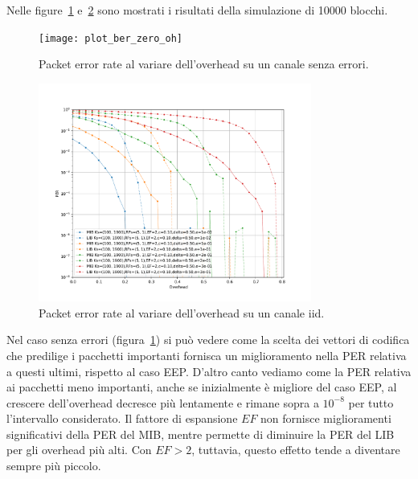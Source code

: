 \documentclass[italian, a4paper, 12pt]{article}
\begin{document}
Nelle figure~\ref{fig:zero_oh} e~\ref{fig:iid_oh} sono mostrati i
risultati della simulazione di 10000 blocchi.
%
\begin{figure}[htb]
  \centering
  \texttt{[image: plot\_ber\_zero\_oh]}
  \caption{Packet error rate al variare dell'overhead su un canale
    senza errori.}
  \label{fig:zero_oh}
\end{figure}
%
\begin{figure}[htb]
  \centering
  \includegraphics[width=0.8\textwidth]{plot_ber_iid}
  \caption{Packet error rate al variare dell'overhead su un canale
    iid.}
  \label{fig:iid_oh}
\end{figure}

%
%

Nel caso senza errori (figura~\ref{fig:zero_oh}) si può vedere come la
scelta dei vettori di codifica che predilige i pacchetti importanti
fornisca un miglioramento nella PER relativa a questi ultimi, rispetto
al caso EEP.
%
D'altro canto vediamo come la PER relativa ai pacchetti meno
importanti, anche se inizialmente è migliore del caso EEP, al crescere
dell'overhead decresce più lentamente e rimane sopra a $10^{-8}$ per
tutto l'intervallo considerato.
%
Il fattore di espansione $EF$ non fornisce miglioramenti significativi
della PER del MIB, mentre permette di diminuire la PER del LIB per gli
overhead più alti. Con $EF > 2$, tuttavia, questo effetto tende a
diventare sempre più piccolo.
\end{document}
